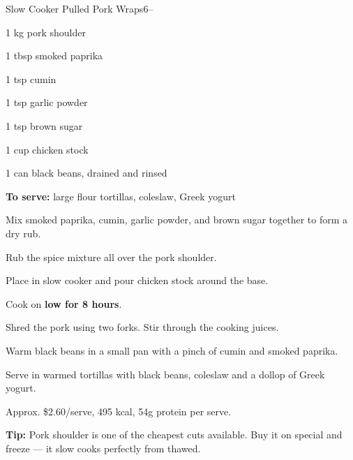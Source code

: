 \begin{recipebox}{Slow Cooker Pulled Pork Wraps}{6}{--}
\begin{ingredients}
  \item 1 kg pork shoulder
  \item 1 tbsp smoked paprika
  \item 1 tsp cumin
  \item 1 tsp garlic powder
  \item 1 tsp brown sugar
  \item 1 cup chicken stock
  \item 1 can black beans, drained and rinsed
  \item \textbf{To serve:} large flour tortillas, coleslaw, Greek yogurt
\end{ingredients}

\begin{method}
  \item Mix smoked paprika, cumin, garlic powder, and brown sugar together to form a dry rub.
  \item Rub the spice mixture all over the pork shoulder.
  \item Place in slow cooker and pour chicken stock around the base.
  \item Cook on \textbf{low for 8 hours}.
  \item Shred the pork using two forks. Stir through the cooking juices.
  \item Warm black beans in a small pan with a pinch of cumin and smoked paprika.
  \item Serve in warmed tortillas with black beans, coleslaw and a dollop of Greek yogurt.
\end{method}

\begin{notelist}
  \item Approx. \$2.60/serve, 495 kcal, 54g protein per serve.
  \item \textbf{Tip:} Pork shoulder is one of the cheapest cuts available. Buy it on special and freeze --- it slow cooks perfectly from thawed.
\end{notelist}
\end{recipebox}
